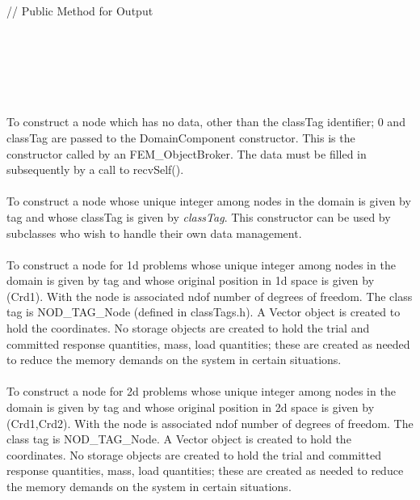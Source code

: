 \indent{}\\ \\
\indent\indent // Public Method for Output \\
\indent{} \\
\indent{} \\ 
\indent{} \\
\indent{} \\



  \\
  \\
To construct a node which has no data, other than the \p classTag
identifier; $0$ and \p classTag are passed to the DomainComponent
constructor. This is the constructor called by an
FEM\_ObjectBroker. The data must be filled in subsequently by a call
to recvSelf(). \\ 

  \\
To construct a node whose unique integer among nodes in the
domain is given by \p tag and whose classTag is given by {\em
classTag}. This constructor can be used by 
subclasses who wish to handle their own data management. \\ 

  \\
To construct a node for 1d problems whose unique integer among nodes in the
domain is given by \p tag and whose original position in 1d space
is given by (Crd1). With the node is associated \p ndof number
of degrees of freedom. The class tag is NOD\_TAG\_Node (defined in
classTags.h). A Vector object is created to hold the coordinates. No
storage objects are created to hold the trial and committed response
quantities, mass, load quantities; these are created as needed to
reduce the memory demands on the system in certain situations. \\ 

  \\
To construct a node for 2d problems whose unique integer among nodes in the
domain is given by \p tag and whose original position in 2d space
is given by (Crd1,Crd2). With the node is associated \p ndof number
of degrees of freedom. The class tag is NOD\_TAG\_Node. A Vector object
is created to hold the coordinates. No
storage objects are created to hold the trial and committed response
quantities, mass, load quantities; these are created as needed to
reduce the memory demands on the system in certain situations. \\ 

